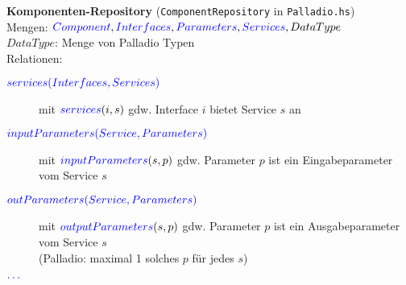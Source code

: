 \documentclass[varwidth=20cm]{standalone}
\begin{document}
\textbf{Komponenten-Repository} (\texttt{ComponentRepository} in \texttt{Palladio.hs})\\

Mengen: ${\color{blue}{Component}}, {\color{blue}{Interfaces}}, {\color{blue}{Parameters}}, {\color{blue}{Services}}, DataType$ \\

$DataType$: Menge von Palladio Typen \\

Relationen:
\begin{description}
  \item[${\color{blue}{services(Interfaces, Services)}}$]
        mit ${\color{blue}{services}}(i, s)$ gdw. Interface $i$ bietet Service $s$ an
  \item[${\color{blue}{inputParameters(Service, Parameters)}}$]
        mit ${\color{blue}{inputParameters}}(s, p)$ gdw. Parameter $p$ ist ein Eingabeparameter vom Service $s$
  \item[${\color{blue}{outParameters(Service, Parameters)}}$]
        mit ${\color{blue}{outputParameters}}(s, p)$ gdw. Parameter $p$ ist ein Ausgabeparameter vom Service $s$ \\
        (Palladio: maximal 1 solches $p$ für jedes $s$)
  \item[${\color{blue}{\ldots}}$]
\end{description}
\end{document}
